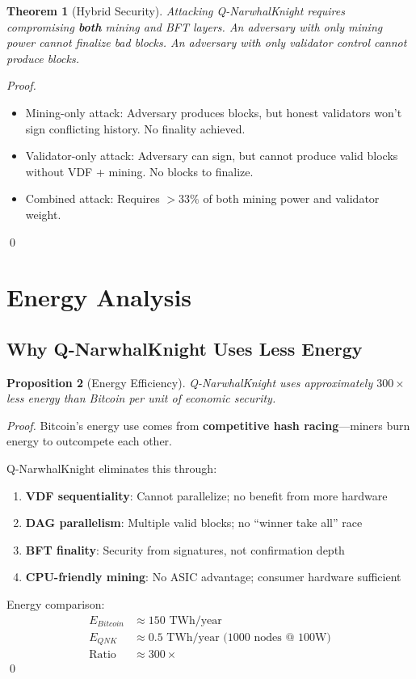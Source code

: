 \documentclass[11pt,a4paper]{article}
\newtheorem{theorem}{Theorem}[section]
\newtheorem{proposition}[theorem]{Proposition}
\begin{document}
\begin{theorem}[Hybrid Security]
Attacking Q-NarwhalKnight requires compromising \textbf{both} mining and BFT layers. An adversary with only mining power cannot finalize bad blocks. An adversary with only validator control cannot produce blocks.
\end{theorem}

\begin{proof}
\begin{itemize}
    \item Mining-only attack: Adversary produces blocks, but honest validators won't sign conflicting history. No finality achieved.
    \item Validator-only attack: Adversary can sign, but cannot produce valid blocks without VDF + mining. No blocks to finalize.
    \item Combined attack: Requires $> 33\%$ of both mining power and validator weight.
\end{itemize}
\qed
\end{proof}

\section{Energy Analysis}

\subsection{Why Q-NarwhalKnight Uses Less Energy}

\begin{proposition}[Energy Efficiency]
Q-NarwhalKnight uses approximately $300\times$ less energy than Bitcoin per unit of economic security.
\end{proposition}

\begin{proof}
Bitcoin's energy use comes from \textbf{competitive hash racing}---miners burn energy to outcompete each other.

Q-NarwhalKnight eliminates this through:
\begin{enumerate}
    \item \textbf{VDF sequentiality}: Cannot parallelize; no benefit from more hardware
    \item \textbf{DAG parallelism}: Multiple valid blocks; no ``winner take all'' race
    \item \textbf{BFT finality}: Security from signatures, not confirmation depth
    \item \textbf{CPU-friendly mining}: No ASIC advantage; consumer hardware sufficient
\end{enumerate}

Energy comparison:
\begin{align}
    E_{Bitcoin} &\approx 150 \text{ TWh/year} \\
    E_{QNK} &\approx 0.5 \text{ TWh/year (1000 nodes @ 100W)} \\
    \text{Ratio} &\approx 300\times
\end{align}
\qed
\end{proof}
\end{document}
